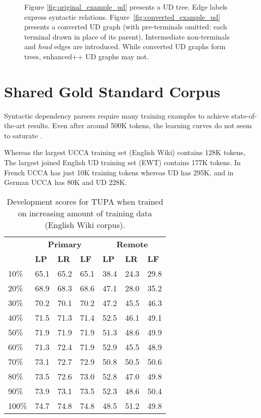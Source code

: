 \documentclass[11pt,a4paper]{article}
\begin{document}
\begin{figure}[!ht]
\caption{Figure \ref{fig:original_example_ud} presents a UD tree.
  Edge labels express syntactic relations.
Figure~\ref{fig:converted_example_ud} presents a converted UD graph
(with pre-terminals omitted: each terminal drawn in place of its parent).
Intermediate non-terminals and \textit{head} edges are introduced.
While converted UD graphs form trees, enhanced++ UD graphs may not.}\label{fig:ud_examples}
\end{figure}


\section{Shared Gold Standard Corpus}\label{sec:data_size}

Syntactic dependency parsers require many training examples to achieve
state-of-the-art results.
Even after around 500K tokens, the learning curves do not seem to saturate
\cite{de2017old,velldal2017joint}.

Whereas the largest UCCA training set (English Wiki) contains 128K tokens,
The largest joined English UD training set (EWT) contains 177K tokens.
In French UCCA has just 10K training tokens whereas UD has 295K,
and in German UCCA has 80K and UD 228K.

\begin{table}[t]
\centering
\begin{tabular}{l|lll|lll}
& \multicolumn{3}{c|}{\footnotesize \bf Primary} & \multicolumn{3}{c}{\footnotesize \bf Remote} \\
& \footnotesize \textbf{LP} & \footnotesize \textbf{LR} & \footnotesize \textbf{LF}
& \footnotesize \textbf{LP} & \footnotesize \textbf{LR} & \footnotesize \textbf{LF} \\
\hline
\footnotesize 10\% & 65.1 & 65.2 & 65.1 & 38.4 & 24.3 & 29.8\\
\footnotesize 20\% & 68.9 & 68.3 & 68.6 & 47.1 & 28.0 & 35.2\\
\footnotesize 30\% & 70.2 & 70.1 & 70.2 & 47.2 & 45.5 & 46.3\\
\footnotesize 40\% & 71.5 & 71.3 & 71.4 & 52.5 & 46.1 & 49.1\\
\footnotesize 50\% & 71.9 & 71.9 & 71.9 & 51.3 & 48.6 & 49.9\\
\footnotesize 60\% & 71.3 & 72.4 & 71.9 & 52.9 & 45.5 & 48.9\\
\footnotesize 70\% & 73.1 & 72.7 & 72.9 & 50.8 & 50.5 & 50.6\\
\footnotesize 80\% & 73.5 & 72.6 & 73.0 & 52.8 & 47.0 & 49.8\\
\footnotesize 90\% & 73.9 & 73.1 & 73.5 & 52.3 & 48.6 & 50.4\\
\footnotesize 100\% & 74.7 & 74.8 & 74.8 & 48.5 & 51.2 & 49.8\\
\end{tabular}
\caption{
Development scores for TUPA \protect\cite{hershcovich2017a} when trained on increasing amount of training data
(English Wiki corpus).
\label{tab:partial_data_results}}
\end{table}
\end{document}
